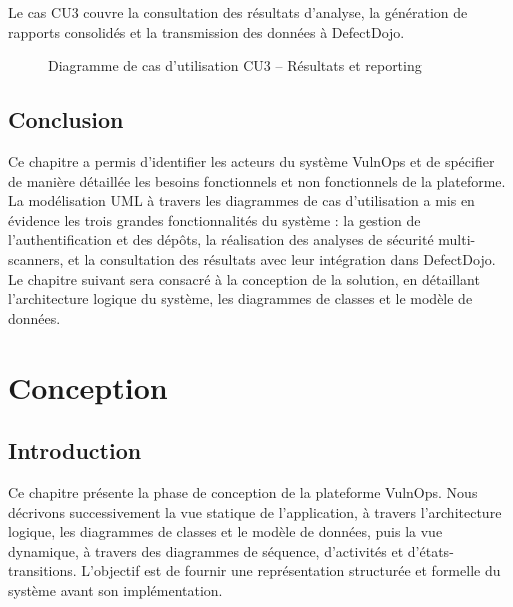 \documentclass[12pt, a4paper, oneside]{report}
\begin{document}
Le cas CU3 couvre la consultation des résultats d'analyse, la génération de
rapports consolidés et la transmission des données à DefectDojo.

\begin{figure}[H]
    \centering
    \caption{Diagramme de cas d'utilisation CU3 -- Résultats et reporting}
    \label{fig:uc3}
\end{figure}

\section*{Conclusion}

Ce chapitre a permis d'identifier les acteurs du système VulnOps et de spécifier
de manière détaillée les besoins fonctionnels et non fonctionnels de la plateforme.
La modélisation UML à travers les diagrammes de cas d'utilisation a mis en évidence
les trois grandes fonctionnalités du système : la gestion de l'authentification
et des dépôts, la réalisation des analyses de sécurité multi-scanners, et
la consultation des résultats avec leur intégration dans DefectDojo.
Le chapitre suivant sera consacré à la conception de la solution, en détaillant
l'architecture logique du système, les diagrammes de classes et le modèle
de données.

\chapter{Conception}
\label{chap:conception}

\section*{Introduction}

Ce chapitre présente la phase de conception de la plateforme VulnOps. Nous
décrivons successivement la vue statique de l'application, à travers l'architecture
logique, les diagrammes de classes et le modèle de données, puis la vue dynamique,
à travers des diagrammes de séquence, d'activités et d'états-transitions.
L'objectif est de fournir une représentation structurée et formelle du système
avant son implémentation.
\end{document}
